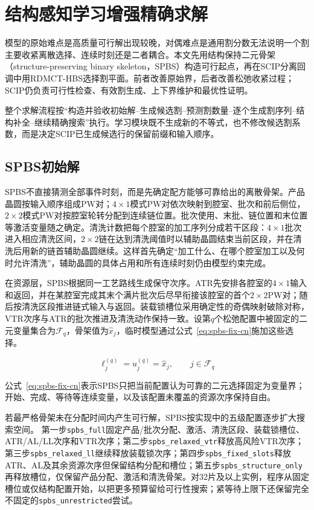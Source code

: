 \documentclass[final,5p,times,twocolumn]{elsarticle}
\newcommand{\method}{RDMCT-HBS}
\begin{document}
\section{结构感知学习增强精确求解}

模型的原始难点是高质量可行解出现较晚，对偶难点是通用割分数无法说明一个割主要收紧离散选择、连续时刻还是二者耦合。本文先用结构保持二元骨架（structure-preserving binary skeleton，SPBS）构造可行起点，再在SCIP分离回调中用\method{}选择割平面。前者改善原始界，后者改善松弛收紧过程；SCIP仍负责可行性检查、有效割生成、上下界维护和最优性证明\citep{achterberg2009scip,bestuzheva2023scip}。

整个求解流程按“构造并验收初始解--生成候选割--预测割数量--逐个生成割序列--结构补全--继续精确搜索”执行。学习模块既不生成新的不等式，也不修改候选割系数，而是决定SCIP已生成候选行的保留前缀和输入顺序。

\subsection{SPBS初始解}

SPBS不直接猜测全部事件时刻，而是先确定配方能够可靠给出的离散骨架。产品晶圆按输入顺序组成PW对；$4\times1$模式PW对依次映射到腔室、批次和前后侧位，$2\times2$模式PW对按腔室轮转分配到连续链位置。批次使用、末批、链位置和末位置等激活变量随之确定。清洗计数把每个腔室的加工序列分成若干区段：$4\times1$批次进入相应清洗区间，$2\times2$链在达到清洗阈值时以辅助晶圆结束当前区段，并在清洗后用新的链首辅助晶圆继续。这样首先确定“加工什么、在哪个腔室加工以及何时允许清洗”，辅助晶圆的具体占用和所有连续时刻仍由模型约束完成。

在资源层，SPBS根据同一工艺路线生成保守次序。ATR先安排各腔室的$4\times1$输入和返回，并在某腔室完成其末个满片批次后尽早衔接该腔室的首个$2\times2$PW对；随后按清洗区段推进链式输入与返回。装载锁槽位采用确定性的奇偶映射破除对称，VTR次序与ATR的批次推进及清洗动作保持一致。设第$q$个松弛配置中被固定的二元变量集合为$\mathcal F_q$，骨架值为$\widehat x_j$，临时模型通过公式~\eqref{eq:spbs-fix-cn}施加这些选择。

\begin{equation}
\ell_j^{(q)}=u_j^{(q)}=\widehat x_j,\qquad j\in\mathcal F_q
\label{eq:spbs-fix-cn}
\end{equation}

公式~\eqref{eq:spbs-fix-cn}表示SPBS只把当前配置认为可靠的二元选择固定为变量界；开始、完成、等待等连续变量，以及该配置未覆盖的资源次序保持自由。

若最严格骨架未在分配时间内产生可行解，SPBS按实现中的五级配置逐步扩大搜索空间。
第一步\texttt{spbs\_full}固定产品/批次分配、激活、清洗区段、装载锁槽位、ATR/AL/LL次序和VTR次序；第二步\texttt{spbs\_relaxed\_vtr}释放高风险VTR次序；第三步\texttt{spbs\_relaxed\_ll}继续释放装载锁次序；第四步\texttt{spbs\_fixed\_slots}释放ATR、AL及其余资源次序但保留结构分配和槽位；第五步\texttt{spbs\_structure\_only}再释放槽位，仅保留产品分配、激活和清洗骨架。对32片及以上实例，程序从固定槽位或仅结构配置开始，以把更多预算留给可行性搜索；紧等待上限下还保留完全不固定的\texttt{spbs\_unrestricted}尝试。
\end{document}
